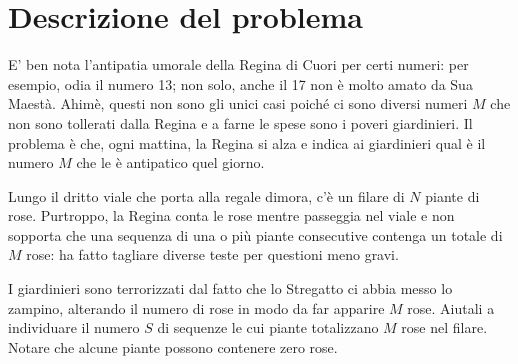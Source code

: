 \documentclass[a4paper,11pt]{article}
\begin{document}
\vspace{0.5cm}



\vspace{0.5cm}

\section*{Descrizione del problema}
  
E' ben nota l'antipatia umorale della Regina di Cuori per certi
numeri: per esempio, odia il numero 13; non solo, anche il 17 non
è molto amato da Sua Maestà. Ahimè, questi non
sono gli unici casi poiché ci sono diversi numeri $M$
che non sono tollerati dalla Regina e a farne le spese sono i poveri
giardinieri. Il problema è che, ogni mattina, la Regina si alza
e indica ai giardinieri qual è il numero $M$ che le
è antipatico quel giorno.

Lungo il dritto viale che porta alla regale dimora, c'è un 
filare di $N$ piante di rose. Purtroppo, la Regina conta le rose mentre
passeggia nel viale e non sopporta che una sequenza di una o
più piante consecutive contenga un totale di $M$ rose:
ha fatto tagliare diverse teste per questioni meno gravi.

I giardinieri sono terrorizzati dal fatto che lo Stregatto ci abbia
messo lo zampino, alterando il numero di rose in modo da far
apparire $M$ rose. Aiutali a
individuare il numero $S$ di sequenze le cui piante
totalizzano $M$ rose nel filare. Notare che alcune piante
possono contenere zero rose.
\end{document}
